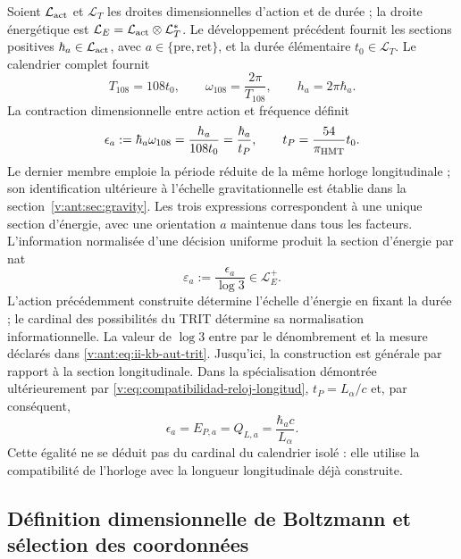 Soient \(\mathcal L_{\rm act}\) et \(\mathcal L_T\) les droites
dimensionnelles d'action et de durée ; la droite énergétique est
\(\mathcal L_E=\mathcal L_{\rm act}\otimes\mathcal L_T^*\).
Le développement précédent fournit les sections positives
\(\hbar_a\in\mathcal L_{\rm act}\), avec
\(a\in\{\mathrm{pre},\mathrm{ret}\}\), et la durée élémentaire
\(t_0\in\mathcal L_T\). Le calendrier complet fournit
\[
 T_{108}=108t_0,\qquad
 \omega_{108}=\frac{2\pi}{T_{108}},\qquad
 h_a=2\pi\hbar_a.
\]
La contraction dimensionnelle entre action et fréquence définit
\begin{equation}
 \epsilon_a:=\hbar_a\omega_{108}
 =\frac{h_a}{108t_0}
 =\frac{\hbar_a}{t_P},\qquad
 t_P=\frac{54}{\pi_{\mathrm{HMT}}}t_0.
 \label{v:ant:eq:ii-kb-aut-energia}
\end{equation}
Le dernier membre emploie la période réduite de la même horloge longitudinale ;
son identification ultérieure à l’échelle gravitationnelle est établie dans
la section~\ref{v:ant:sec:gravity}. Les trois expressions correspondent à une unique
section d’énergie, avec une orientation \(a\) maintenue dans tous
les facteurs. L’information normalisée d’une décision uniforme
produit la section d’énergie par nat
\begin{equation}
 \varepsilon_a:=\frac{\epsilon_a}{\log3}\in\mathcal L_E^+.
 \label{v:ant:eq:ii-kb-aut-energia-nat}
\end{equation}
L’action précédemment construite détermine l’échelle d’énergie en
fixant la durée ; le cardinal des possibilités du TRIT détermine sa
normalisation informationnelle. La valeur de \(\log3\) entre par le
dénombrement et la mesure déclarés dans \eqref{v:ant:eq:ii-kb-aut-trit}.
Jusqu’ici, la construction est générale par rapport à la section longitudinale.
Dans la spécialisation démontrée ultérieurement par
\eqref{v:eq:compatibilidad-reloj-longitud},
\(t_P=L_\alpha/c\) et, par conséquent,
\begin{equation}
 \epsilon_a=E_{P,a}=Q_{L,a}
 =\frac{\hbar_ac}{L_\alpha}.
 \label{v:eq:especializacion-termica-longitudinal}
\end{equation}
Cette égalité ne se déduit pas du cardinal du calendrier isolé : elle utilise la
compatibilité de l’horloge avec la longueur longitudinale déjà construite.

\subsection{Définition dimensionnelle de Boltzmann et sélection des coordonnées}

